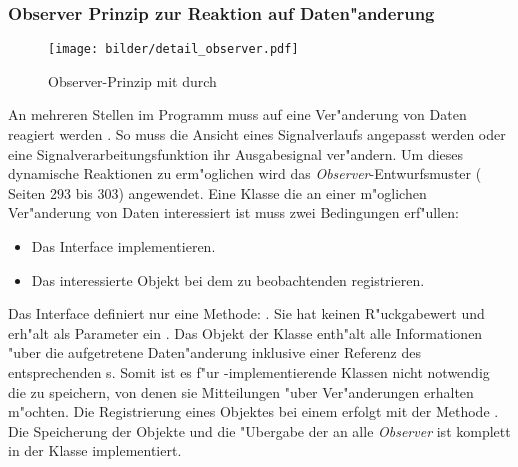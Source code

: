 \subsubsection{Observer Prinzip zur Reaktion auf Daten"anderung}

\begin{figure}[bth]
\centering
\texttt{[image: bilder/detail\_observer.pdf]}
\caption{Observer-Prinzip mit durch }
\label{pic:observer}
\end{figure}

An mehreren Stellen im Programm muss auf eine Ver"anderung von Daten reagiert werden .
So muss die Ansicht eines Signalverlaufs angepasst werden oder eine Signalverarbeitungsfunktion ihr Ausgabesignal ver"andern.
Um dieses dynamische Reaktionen zu erm"oglichen wird das \emph{Observer}-Entwurfsmuster (\cite{Gamma1995} Seiten 293 bis 303) angewendet.
Eine Klasse die an einer m"oglichen Ver"anderung von Daten interessiert ist muss zwei Bedingungen erf"ullen:
\begin{itemize}
	\item Das Interface  implementieren.
	\item Das interessierte Objekt bei dem zu beobachtenden  registrieren.
\end{itemize}
Das Interface  definiert nur eine Methode: .
Sie hat keinen R"uckgabewert und erh"alt als Parameter ein .
Das Objekt der Klasse  enth"alt alle Informationen "uber die aufgetretene Daten"anderung inklusive einer Referenz des entsprechenden s.
Somit ist es f"ur -implementierende Klassen nicht notwendig die  zu speichern, von denen sie Mitteilungen "uber Ver"anderungen erhalten m"ochten.
Die Registrierung eines Objektes bei einem  erfolgt mit der Methode .
Die Speicherung der Objekte und die "Ubergabe der  an alle \emph{Observer} ist komplett in der Klasse  implementiert.

